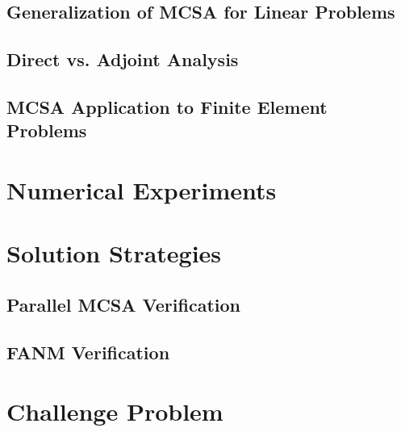 \subsection{Generalization of MCSA for Linear Problems}
\label{subsec:mcsa_generalization}

\subsection{Direct vs. Adjoint Analysis}
\label{subsec:mcsa_direct_vs_adjoint}

\subsection{MCSA Application to Finite Element Problems}
\label{subsec:mcsa_finite_element}

\section{Numerical Experiments}
\label{sec:key_questions}

\section{Solution Strategies}
\label{sec:solution_strategies}

\subsection{Parallel MCSA Verification}
\label{subsubsec:mcsa_verification}

\subsection{FANM Verification}
\label{subsubsec:fanm_verification}

\section{Challenge Problem}
\label{sec:challenge_problem}
